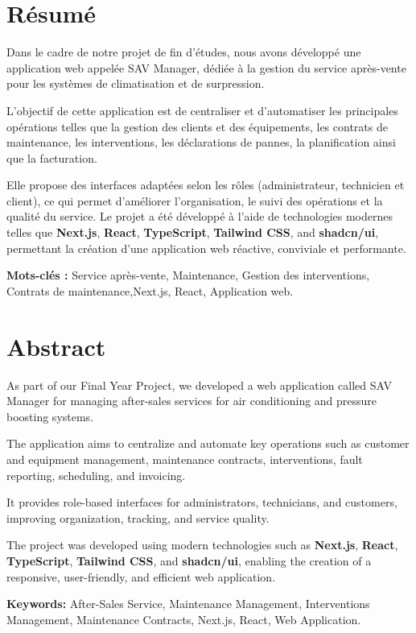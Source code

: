 \thispagestyle{empty}
\section*{Résumé}

Dans le cadre de notre projet de fin d’études, nous avons développé une application web appelée SAV Manager, dédiée à la gestion du service après-vente pour les systèmes de climatisation et de surpression.

L’objectif de cette application est de centraliser et d’automatiser les principales opérations telles que la gestion des clients et des équipements, les contrats de maintenance, les interventions, les déclarations de pannes, la planification ainsi que la facturation.

Elle propose des interfaces adaptées selon les rôles (administrateur, technicien et client), ce qui permet d’améliorer l’organisation, le suivi des opérations et la qualité du service.
Le projet a été développé à l’aide de technologies modernes telles que \textbf{Next.js}, \textbf{React}, \textbf{TypeScript}, \textbf{Tailwind CSS}, and \textbf{shadcn/ui}, permettant la création d’une application web réactive, conviviale et performante.

\textbf{Mots-clés :} Service après-vente, Maintenance, Gestion des interventions, Contrats de maintenance,Next.js, React, Application web.

\bigskip

\section*{Abstract}

As part of our Final Year Project, we developed a web application called SAV Manager for managing after-sales services for air conditioning and pressure boosting systems.

The application aims to centralize and automate key operations such as customer and equipment management, maintenance contracts, interventions, fault reporting, scheduling, and invoicing.

It provides role-based interfaces for administrators, technicians, and customers, improving organization, tracking, and service quality.

The project was developed using modern technologies such as \textbf{Next.js}, \textbf{React}, \textbf{TypeScript}, \textbf{Tailwind CSS}, and \textbf{shadcn/ui}, enabling the creation of a responsive, user-friendly, and efficient web application.

\textbf{Keywords:} After-Sales Service, Maintenance Management, Interventions Management, Maintenance Contracts, Next.js, React, Web Application.
